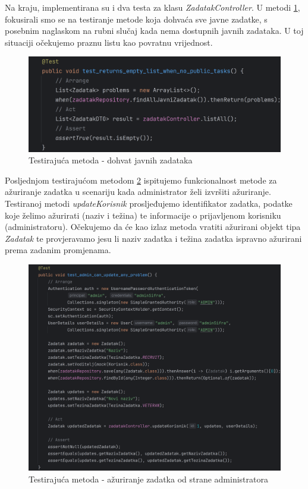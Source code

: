 Na kraju, implementirana su i dva testa za klasu \textit{ZadatakController}. U metodi \ref{fig:test6}, fokusirali smo se na testiranje metode koja dohvaća sve javne zadatke, s posebnim naglaskom na rubni slučaj kada nema dostupnih javnih zadataka. U toj situaciji očekujemo praznu listu kao povratnu vrijednost.

\begin{figure}[H]
	\includegraphics[scale=0.2]{slike/test6.png}
	\centering
	\caption{Testirajuća metoda - dohvat javnih zadataka}
	\label{fig:test6}
\end{figure}

Posljednjom testirajućom metodom \ref{fig:test7} ispitujemo funkcionalnost metode za ažuriranje zadatka u scenariju kada administrator želi izvršiti ažuriranje. Testiranoj metodi \textit{updateKorisnik} prosljeđujemo identifikator zadatka, podatke koje želimo ažurirati (naziv i težina) te informacije o prijavljenom korisniku (administratoru). Očekujemo da će kao izlaz metoda vratiti ažurirani objekt tipa \textit{Zadatak} te provjeravamo jesu li naziv zadatka i težina zadatka ispravno ažurirani prema zadanim promjenama.


\begin{figure}[H]
	\includegraphics[scale=0.13]{slike/test7.png}
	\centering
	\caption{Testirajuća metoda - ažuriranje zadatka od strane administratora}
	\label{fig:test7}
\end{figure}

